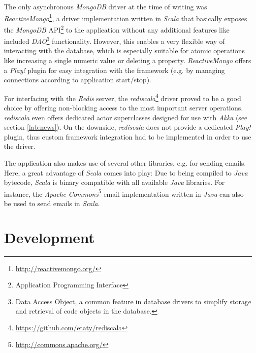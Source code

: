The only asynchronous \textit{MongoDB} driver at the time of writing was \textit{ReactiveMongo}\footnote{\url{http://reactivemongo.org/}}, a driver implementation written in \textit{Scala} that basically exposes the \textit{MongoDB} API\footnote{Application Programming Interface} to the application without any additional features like included \textit{DAO}\footnote{Data Access Object, a common feature in database drivers to simplify storage and retrieval of code objects in the database.} functionality. However, this enables a very flexible way of interacting with the database, which is especially suitable for atomic operations like increasing a single numeric value or deleting a property. \textit{ReactiveMongo} offers a \textit{Play!} plugin for easy integration with the framework (e.g. by managing connections according to application start/stop).

For interfacing with the \textit{Redis} server, the \textit{rediscala}\footnote{\url{https://github.com/etaty/rediscala}} driver proved to be a good choice by offering non-blocking access to the most important server operations. \textit{rediscala} even offers dedicated actor superclasses designed for use with \textit{Akka} (see section \ref{lab:news}). On the downside, \textit{rediscala} does not provide a dedicated \textit{Play!} plugin, thus custom framework integration had to be implemented in order to use the driver.

The application also makes use of several other libraries, e.g. for sending emails. Here, a great advantage of \textit{Scala} comes 
into play: Due to being compiled to \textit{Java} bytecode, \textit{Scala} is binary compatible with all available \textit{Java} libraries. For instance, the \textit{Apache Commons}\footnote{\url{http://commons.apache.org/}} email implementation written in \textit{Java} can also be used to send emails in \textit{Scala}.

\section{Development}
\label{lab:impl-dev}
